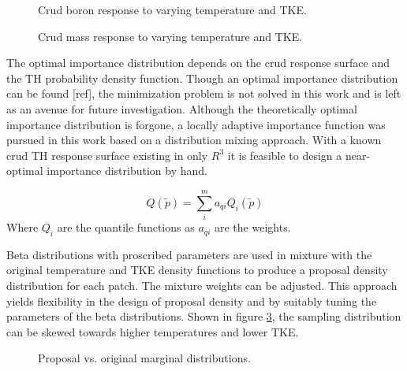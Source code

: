 \begin{figure}[H]%
    \centering
    \qquad
    \caption[]{Crud boron response to varying temperature and TKE.}%
    \label{fig:crud_sensi2}%
\end{figure}

\begin{figure}[H]%
    \centering
    \qquad
    \caption[]{Crud mass response to varying temperature and TKE.}%
    \label{fig:crud_sensi3}%
\end{figure}


The optimal importance distribution depends on the crud response surface and the TH probability density function.  Though an optimal importance distribution can be found [ref], the minimization problem is not solved in this work and is left as an avenue for future investigation.
Although the theoretically optimal importance distribution is forgone, a locally adaptive importance function was pursued in this work based on a distribution mixing approach.  With a known crud TH response surface existing in only $R^3$ it is feasible to design a near-optimal importance distribution by hand.

\begin{equation}
Q(\tilde{p}) = \sum_i^m a_{qi} Q_i(\tilde{p})
\end{equation}
Where $Q_i$ are the quantile functions as $a_{qi}$ are the weights.

Beta distributions with proscribed parameters are used in mixture with the original temperature and TKE density functions to produce a proposal density distribution for each patch.  The mixture weights can be adjusted.  This approach yields flexibility in the design of proposal density and by suitably tuning the parameters of the beta distributions.  Shown in figure \ref{fig:imp_sample2}, the sampling distribution can be skewed towards higher temperatures and lower TKE.

\begin{figure}[H]%
    \centering
    \qquad
    \caption[]{Proposal vs. original marginal distributions.}%
    \label{fig:imp_sample2}%
\end{figure}


